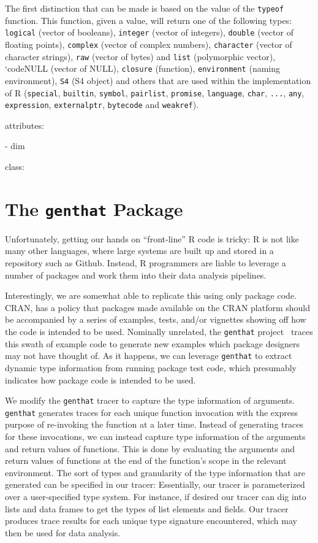 \documentclass[acmsmall,10pt,review,anonymous]{acmart}\settopmatter{printfolios=true,printccs=false,printacmref=false}
\newcommand{\code}[1]{\lstinline|#1|\xspace}
\begin{document}
The first distinction that can be made is based on the value of the
\code{typeof} function.  This function, given a value, will return one of
the following types: \code{logical} (vector of booleans), \code{integer}
(vector of integers), \code{double} (vector of floating points),
\code{complex} (vector of complex numbers), \code{character} (vector of
character strings), \code{raw} (vector of bytes) and \code{list}
(polymorphic vector), \x`code{NULL} (vector of NULL),
\code{closure} (function), \code{environment} (naming environment),
\code{S4} (S4 object) and others that are used within the implementation of
R (\code{special}, \code{builtin}, \code{symbol}, \code{pairlist},
\code{promise}, \code{language}, \code{char}, \code{...}, \code{any},
\code{expression}, \code{externalptr}, \code{bytecode} and \code{weakref}).




attributes:

  - dim

class:


\section{The \texttt{genthat} Package}

Unfortunately, getting our hands on ``front-line'' R code is tricky: R is
not like many other languages, where large systems are built up and stored
in a repository such as Github.  Instead, R programmers are liable to
leverage a number of packages and work them into their data analysis
pipelines.

Interestingly, we are somewhat able to replicate this using only package
code.  CRAN, has a policy that packages made available on the CRAN platform
should be accompanied by a series of examples, tests, and/or vignettes
showing off how the code is intended to be used.  Nominally unrelated, the
{\tt genthat} project~\cite{issta18} traces this swath of example code to
generate new examples which package designers may not have thought of.  As
it happens, we can leverage {\tt genthat} to extract dynamic type
information from running package test code, which presumably indicates how
package code is intended to be used.


We modify the {\tt genthat} tracer to capture the type information of
arguments.  {\tt genthat} generates traces for each unique function
invocation with the express purpose of re-invoking the function at a later
time.  Instead of generating traces for these invocations, we can instead
capture type information of the arguments and return values of functions.
This is done by evaluating the arguments and return values of functions at
the end of the function's scope in the relevant environment.  The sort of
types and granularity of the type information that are generated can be
specified in our tracer: Essentially, our tracer is parameterized over a
user-specified type system.  For instance, if desired our tracer can dig
into lists and data frames to get the types of list elements and fields.
Our tracer produces trace results for each unique type signature
encountered, which may then be used for data analysis.
\end{document}
